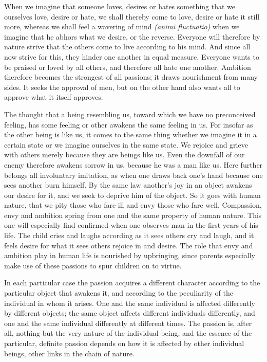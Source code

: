 \documentclass[12pt]{book}
\newcommand{\opage}[1]{\marginnote{\footnotesize\textit{[#1]}}}
\begin{document}
When we imagine that someone loves, desires or hates something that we ourselves love,
desire or hate, we shall thereby come to love, desire or hate it \opage{128}still more,
whereas we shall feel a wavering of mind \textit{(animi fluctuatio)} when we imagine that
he abhors what we desire, or the reverse. Everyone will therefore by nature strive that
the others come to live according to his mind. And since all now strive for this, they
hinder one another in equal measure. Everyone wants to be praised or loved by all others,
and therefore all hate one another. Ambition therefore becomes the strongest of all
passions; it draws nourishment from many sides. It seeks the approval of men, but on the
other hand also wants all to approve what it itself approves.

The thought that a being resembling us, toward which we have no preconceived feeling,
has some feeling or other awakens the same feeling in us. For insofar as the other being
is like us, it comes to the same thing whether we imagine it in a certain state or we
imagine ourselves in the same state. We rejoice and grieve with others merely because
they are beings like us. Even the downfall of our enemy therefore awakens sorrow in us,
because he was a man like us. Here further belongs all involuntary imitation, as when one
draws back one's hand because one sees another burn himself. By the same law another's
joy in an object awakens our desire for it, and we seek to deprive him of the object. So
it goes with human nature, that we pity those who fare ill and envy those who fare well.
Compassion, envy and ambition spring from one and the same property of human nature.
This one will especially find confirmed when one \opage{129}observes man in the first
years of his life. The child cries and laughs according as it sees others cry and laugh,
and it feels desire for what it sees others rejoice in and desire. The role that envy
and ambition play in human life is nourished by upbringing, since parents especially
make use of these passions to spur children on to virtue.

In each particular case the passion acquires a different character according to the
particular object that awakens it, and according to the peculiarity of the individual in
whom it arises. One and the same individual is affected differently by different
objects; the same object affects different individuals differently, and one and the same
individual differently at different times. The passion is, after all, nothing but the
very nature of the individual being, and the essence of the particular, definite passion
depends on how it is affected by other individual beings, other links in the chain of
nature.
\end{document}
